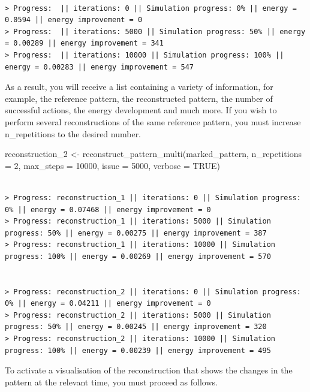 \documentclass[
  letterpaper,
  DIV=11,
  numbers=noendperiod]{scrreprt}
\newenvironment{Shaded}{\begin{snugshade}}{\end{snugshade}}
\newcommand{\AttributeTok}[1]{\textcolor[rgb]{0.40,0.45,0.13}{#1}}
\newcommand{\ConstantTok}[1]{\textcolor[rgb]{0.56,0.35,0.01}{#1}}
\newcommand{\DecValTok}[1]{\textcolor[rgb]{0.68,0.00,0.00}{#1}}
\newcommand{\FunctionTok}[1]{\textcolor[rgb]{0.28,0.35,0.67}{#1}}
\newcommand{\NormalTok}[1]{\textcolor[rgb]{0.00,0.23,0.31}{#1}}
\newcommand{\OtherTok}[1]{\textcolor[rgb]{0.00,0.23,0.31}{#1}}
\begin{document}
\begin{verbatim}

> Progress:  || iterations: 0 || Simulation progress: 0% || energy = 0.0594 || energy improvement = 0
> Progress:  || iterations: 5000 || Simulation progress: 50% || energy = 0.00289 || energy improvement = 341
> Progress:  || iterations: 10000 || Simulation progress: 100% || energy = 0.00283 || energy improvement = 547
\end{verbatim}

As a result, you will receive a list containing a variety of
information, for example, the reference pattern, the reconstructed
pattern, the number of successful actions, the energy development and
much more. If you wish to perform several reconstructions of the same
reference pattern, you must increase n\_repetitions to the desired
number.

\begin{Shaded}
\begin{Highlighting}[]
\NormalTok{reconstruction\_2 }\OtherTok{\textless{}{-}} \FunctionTok{reconstruct\_pattern\_multi}\NormalTok{(marked\_pattern, }\AttributeTok{n\_repetitions =} \DecValTok{2}\NormalTok{, }\AttributeTok{max\_steps =} \DecValTok{10000}\NormalTok{, }\AttributeTok{issue =} \DecValTok{5000}\NormalTok{, }\AttributeTok{verbose =} \ConstantTok{TRUE}\NormalTok{)}
\end{Highlighting}
\end{Shaded}

\begin{verbatim}

> Progress: reconstruction_1 || iterations: 0 || Simulation progress: 0% || energy = 0.07468 || energy improvement = 0
> Progress: reconstruction_1 || iterations: 5000 || Simulation progress: 50% || energy = 0.00275 || energy improvement = 387
> Progress: reconstruction_1 || iterations: 10000 || Simulation progress: 100% || energy = 0.00269 || energy improvement = 570


> Progress: reconstruction_2 || iterations: 0 || Simulation progress: 0% || energy = 0.04211 || energy improvement = 0
> Progress: reconstruction_2 || iterations: 5000 || Simulation progress: 50% || energy = 0.00245 || energy improvement = 320
> Progress: reconstruction_2 || iterations: 10000 || Simulation progress: 100% || energy = 0.00239 || energy improvement = 495
\end{verbatim}

To activate a visualisation of the reconstruction that shows the changes
in the pattern at the relevant time, you must proceed as follows.
\end{document}
